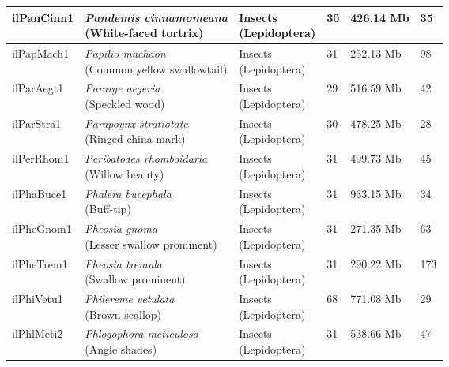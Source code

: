 \begin{centering}
\begin{longtable}{l|l|l|l|l|l}
ilPanCinn1 & \makecell[{l}]{\textit{Pandemis cinnamomeana} \\ (White-faced tortrix)} & \makecell[{l}]{Insects \\ (Lepidoptera)} & 30 & 426.14 Mb & 35  \\ \hline
ilPapMach1 & \makecell[{l}]{\textit{Papilio machaon} \\ (Common yellow swallowtail)} & \makecell[{l}]{Insects \\ (Lepidoptera)} & 31 & 252.13 Mb & 98  \\ \hline
ilParAegt1 & \makecell[{l}]{\textit{Pararge aegeria} \\ (Speckled wood)} & \makecell[{l}]{Insects \\ (Lepidoptera)} & 29 & 516.59 Mb & 42  \\ \hline
ilParStra1 & \makecell[{l}]{\textit{Parapoynx stratiotata} \\ (Ringed china-mark)} & \makecell[{l}]{Insects \\ (Lepidoptera)} & 30 & 478.25 Mb & 28  \\ \hline
ilPerRhom1 & \makecell[{l}]{\textit{Peribatodes rhomboidaria} \\ (Willow beauty)} & \makecell[{l}]{Insects \\ (Lepidoptera)} & 31 & 499.73 Mb & 45  \\ \hline
ilPhaBuce1 & \makecell[{l}]{\textit{Phalera bucephala} \\ (Buff-tip)} & \makecell[{l}]{Insects \\ (Lepidoptera)} & 31 & 933.15 Mb & 34  \\ \hline
ilPheGnom1 & \makecell[{l}]{\textit{Pheosia gnoma} \\ (Lesser swallow prominent)} & \makecell[{l}]{Insects \\ (Lepidoptera)} & 31 & 271.35 Mb & 63  \\ \hline
ilPheTrem1 & \makecell[{l}]{\textit{Pheosia tremula} \\ (Swallow prominent)} & \makecell[{l}]{Insects \\ (Lepidoptera)} & 31 & 290.22 Mb & 173  \\ \hline
ilPhiVetu1 & \makecell[{l}]{\textit{Philereme vetulata} \\ (Brown scallop)} & \makecell[{l}]{Insects \\ (Lepidoptera)} & 68 & 771.08 Mb & 29  \\ \hline
ilPhlMeti2 & \makecell[{l}]{\textit{Phlogophora meticulosa} \\ (Angle shades)} & \makecell[{l}]{Insects \\ (Lepidoptera)} & 31 & 538.66 Mb & 47  \\ \hline

\end{longtable}
\end{centering}
